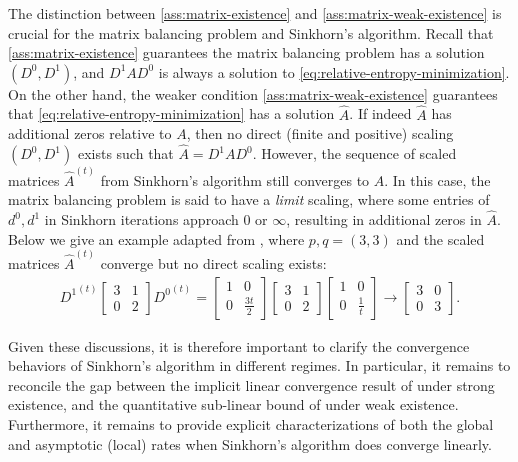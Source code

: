 The distinction between \cref{ass:matrix-existence} and \cref{ass:matrix-weak-existence} is crucial for the matrix balancing problem and Sinkhorn's algorithm. Recall that \cref{ass:matrix-existence} guarantees the matrix balancing problem has a solution $(D^0,D^1)$, and $D^1AD^0$ is always a solution to \eqref{eq:relative-entropy-minimization}. On the other hand, the weaker condition \cref{ass:matrix-weak-existence} guarantees that \eqref{eq:relative-entropy-minimization} has a solution $\hat A$.
If indeed $\hat A$ has additional zeros relative to $A$, then no direct (finite and positive) scaling $(D^{0},D^{1})$ exists such that $\hat A=D^1AD^0$. However, the sequence of scaled matrices $\hat A^{(t)}$ from Sinkhorn's algorithm still converges to $\hat A$. In this case, the matrix balancing problem is said to have a \emph{limit} scaling, where some entries of $d^{0},d^{1}$ in Sinkhorn iterations approach 0 or $\infty$, resulting in additional zeros in $\hat A$. Below we give an example adapted from \citet{pukelsheim2009iterative}, where $p,q=(3,3)$ and the scaled matrices $\hat A^{(t)}$ converge but no direct scaling exists:
\begin{align*}
{D^{1}}^{(t)}\begin{bmatrix}3&1\\
0 & 2
\end{bmatrix}{D^{0}}^{(t)} = \begin{bmatrix}1&0\\
0 & \frac{3t}{2}
\end{bmatrix}\begin{bmatrix}3&1\\
0 & 2
\end{bmatrix}\begin{bmatrix}1&0\\
0 & \frac{1}{t}
\end{bmatrix}	\rightarrow \begin{bmatrix}3&0\\
0 & 3
\end{bmatrix}.
\end{align*}

Given these discussions, it is therefore important to clarify the convergence behaviors of Sinkhorn's algorithm in different regimes. In particular, it remains to reconcile the gap between the implicit linear convergence result of \citet{luo1992convergence} under strong existence, and the quantitative sub-linear bound of \citet{leger2021gradient} under weak existence. Furthermore, it remains to provide explicit characterizations of both the global and asymptotic (local) rates when Sinkhorn's algorithm does converge linearly. 

